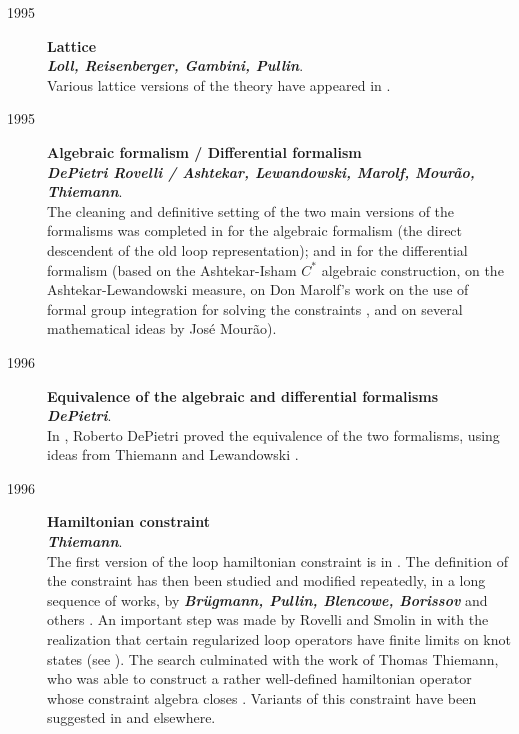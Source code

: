 \documentclass[12pt]{article}
\begin{document}
\begin{description}
	\item[1995] {\bf  Lattice\\
	{\em Loll, Reisenberger, Gambini, Pullin}}.\\
	Various lattice versions of the theory have appeared in 
	\cite{Loll95a,Reisenberger,GambiniPullin,GambiniLattice}.

	\item[1995] {\bf Algebraic formalism / Differential 
	formalism\\
	{\em DePietri Rovelli / Ashtekar, Lewandowski, Marolf, 
	Mour\~{a}o, Thiemann}}.\\
	The cleaning and definitive setting of the two main versions of 
	the formalisms was completed in \cite{DePietriRovelli} for the 
	algebraic formalism (the direct descendent of the old loop 
	representation); and in \cite{AshtekarEtAl95} for the differential 
	formalism (based on the Ashtekar-Isham $C^{*}$ algebraic 
	construction, on the Ashtekar-Lewandowski measure, on Don Marolf's 
	work on the use of formal group integration for solving the 
	constraints \cite{MarolfGroup,MarolfGroup2,MarolfGroup3}, and on 
	several mathematical ideas by Jos\'{e} Mour\~ao).
	
	\item[1996] {\bf Equivalence of the algebraic and 
	differential formalisms\\
	{\em DePietri}}.\\ 
	In \cite{DePietri}, Roberto DePietri proved the equivalence 
	of the two formalisms, using ideas from Thiemann 
	\cite{Thiemann95} and Lewandowski \cite{Lewandowski97}.

	\item[1996] {\bf Hamiltonian constraint\\
	{\em Thiemann}}.\\
	The first version of the loop hamiltonian constraint is in 
	\cite{RovelliSmolin88,RovelliSmolin90}.  The definition of 
	the constraint has then been studied and modified repeatedly, 
	in a long sequence of works, by \textbf{\em Br\"ugmann, 
	Pullin, Blencowe, Borissov} and others 
	\cite{H1,H2,H3,H4,H5,H6,H7,H8,H9}.  An important step was 
	made by Rovelli and Smolin in \cite{RovelliSmolin94} with the 
	realization that certain regularized loop operators have 
	finite limits on knot states (see \cite{LewandowskiMarolf}).  
	The search culminated with the work of Thomas Thiemann, who 
	was able to construct a rather well-defined hamiltonian 
	operator whose constraint algebra closes 
	\cite{Thiemann96,Thiemann96b,Thiemann96c}.  Variants of this 
	constraint have been suggested in 
	\cite{Smolin96,ReisenbergerRovelli} and elsewhere.


\end{description}
\end{document}
